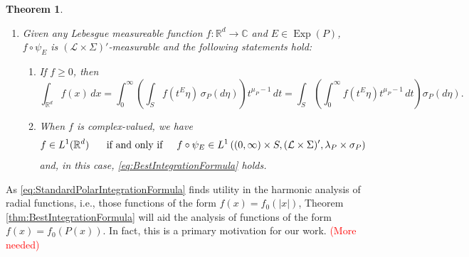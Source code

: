 \documentclass[11pt]{article}
\newtheorem{theorem}{Theorem}[section]
\newcommand\Exp{\operatorname{Exp}}
\begin{document}
\begin{theorem}
\begin{enumerate}
\begin{equation*}
m(A)=(\lambda_P\times\sigma_P)(\psi_E^{-1}(A)).
\end{equation*}
\item\label{property:BestIntegrationFormula} Given any Lebesgue measureable function $f:\mathbb{R}^d\to\mathbb{C}$ and $E\in \Exp(P)$, $f\circ \psi_E$ is $(\mathcal{L}\times\Sigma)'$-measurable and the following statements hold:
\begin{enumerate}
\item If $f\geq 0$, then
\begin{equation}\label{eq:BestIntegrationFormula}
\int_{\mathbb{R}^d}f(x)\,dx=\int_0^\infty\left(\int_S f(t^E\eta)\,\sigma_P(d\eta)\right)t^{\mu_P-1}\,dt=\int_S\left(\int_0^\infty f(t^E\eta)t^{\mu_P-1}\,dt\right)\sigma_P(d\eta).
\end{equation}
\item When $f$ is complex-valued, we have 
\begin{equation*}f\in L^1(\mathbb{R}^d)\hspace{.5cm}\mbox{ if and only if}\hspace{.5cm}f\circ\psi_E\in L^1\left((0,\infty)\times S,(\mathcal{L}\times\Sigma)',\lambda_P\times\sigma_P\right)
\end{equation*} 
and, in this case, \eqref{eq:BestIntegrationFormula} holds.
\end{enumerate}
\end{enumerate}
\end{theorem}
\noindent As \eqref{eq:StandardPolarIntegrationFormula} finds utility in the harmonic analysis of radial functions, i.e., those functions of the form $f(x)=f_0(|x|)$, Theorem \ref{thm:BestIntegrationFormula} will aid the analysis of functions of the form $f(x)=f_0(P(x))$. In fact, this is a primary motivation for our work. \textcolor{red}{(More needed)}\\
\end{document}
